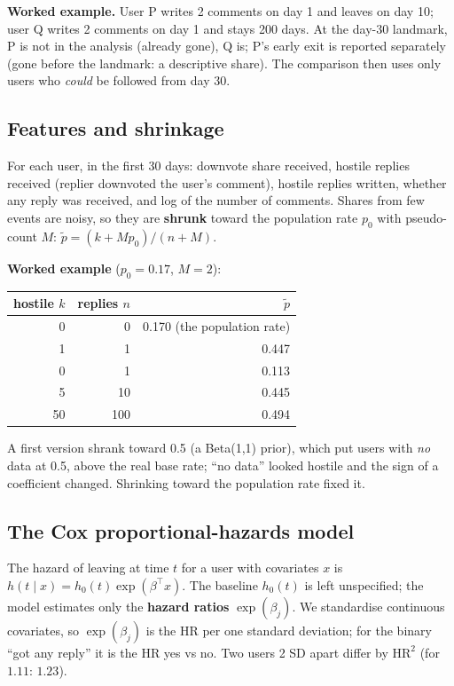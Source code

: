 \documentclass[11pt,a4paper]{article}
\begin{document}
\textbf{Worked example.} User P writes 2 comments on day 1 and leaves on day 10; user Q writes 2 comments on day 1 and stays 200 days. At the day-30 landmark, P is not in the analysis (already gone), Q is; P's early exit is reported separately (gone before the landmark: a descriptive share). The comparison then uses only users who \emph{could} be followed from day 30.

\subsection{Features and shrinkage}
For each user, in the first 30 days: downvote share received, hostile replies received (replier downvoted the user's comment), hostile replies written, whether any reply was received, and log of the number of comments. Shares from few events are noisy, so they are \textbf{shrunk} toward the population rate $p_0$ with pseudo-count $M$: $\tilde p=(k+Mp_0)/(n+M)$.

\textbf{Worked example} ($p_0=0.17$, $M=2$):\par\smallskip
\begin{tabular}{@{}rrr@{}}
\toprule
hostile $k$ & replies $n$ & $\tilde p$\\
\midrule
0 & 0 & 0.170 (the population rate)\\
1 & 1 & 0.447\\
0 & 1 & 0.113\\
5 & 10 & 0.445\\
50 & 100 & 0.494\\
\bottomrule
\end{tabular}

A first version shrank toward 0.5 (a Beta(1,1) prior), which put users with \emph{no} data at 0.5, above the real base rate; ``no data'' looked hostile and the sign of a coefficient changed. Shrinking toward the population rate fixed it.

\subsection{The Cox proportional-hazards model}
The hazard of leaving at time $t$ for a user with covariates $x$ is $h(t\mid x)=h_0(t)\exp(\beta^\top x)$. The baseline $h_0(t)$ is left unspecified; the model estimates only the \textbf{hazard ratios} $\exp(\beta_j)$. We standardise continuous covariates, so $\exp(\beta_j)$ is the HR per one standard deviation; for the binary ``got any reply'' it is the HR yes vs no. Two users 2 SD apart differ by $\mathrm{HR}^2$ (for $1.11$: $1.23$).
\end{document}
